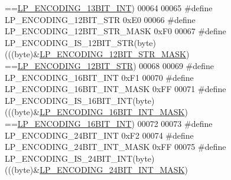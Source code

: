 \begin{DoxyCode}
{      ==}\hyperlink{listpack_8c_a9cfea84c38c5cf0d152f0e40fdd7c1fc}{LP\_ENCODING\_13BIT\_INT}\textcolor{preprocessor}{)}
00064 
00065 \textcolor{preprocessor}{#}\textcolor{preprocessor}{define} \textcolor{preprocessor}{LP\_ENCODING\_12BIT\_STR} 0xE0
00066 \textcolor{preprocessor}{#}\textcolor{preprocessor}{define} \textcolor{preprocessor}{LP\_ENCODING\_12BIT\_STR\_MASK} 0xF0
00067 \textcolor{preprocessor}{#}\textcolor{preprocessor}{define} \textcolor{preprocessor}{LP\_ENCODING\_IS\_12BIT\_STR}\textcolor{preprocessor}{(}\textcolor{preprocessor}{byte}\textcolor{preprocessor}{)} \textcolor{preprocessor}{(}\textcolor{preprocessor}{(}\textcolor{preprocessor}{(}\textcolor{preprocessor}{byte}\textcolor{preprocessor}{)}\textcolor{preprocessor}{&}\hyperlink{listpack_8c_a05220e3facf52ce6d8a3dcd337aec945}{LP\_ENCODING\_12BIT\_STR\_MASK}\textcolor{preprocessor}{)}\textcolor{preprocessor}{
      ==}\hyperlink{listpack_8c_acf85ac38dc36778e68c75963245a3959}{LP\_ENCODING\_12BIT\_STR}\textcolor{preprocessor}{)}
00068 
00069 \textcolor{preprocessor}{#}\textcolor{preprocessor}{define} \textcolor{preprocessor}{LP\_ENCODING\_16BIT\_INT} 0xF1
00070 \textcolor{preprocessor}{#}\textcolor{preprocessor}{define} \textcolor{preprocessor}{LP\_ENCODING\_16BIT\_INT\_MASK} 0xFF
00071 \textcolor{preprocessor}{#}\textcolor{preprocessor}{define} \textcolor{preprocessor}{LP\_ENCODING\_IS\_16BIT\_INT}\textcolor{preprocessor}{(}\textcolor{preprocessor}{byte}\textcolor{preprocessor}{)} \textcolor{preprocessor}{(}\textcolor{preprocessor}{(}\textcolor{preprocessor}{(}\textcolor{preprocessor}{byte}\textcolor{preprocessor}{)}\textcolor{preprocessor}{&}\hyperlink{listpack_8c_acdb130b39e0800198f74fe031bddbfe2}{LP\_ENCODING\_16BIT\_INT\_MASK}\textcolor{preprocessor}{)}\textcolor{preprocessor}{
      ==}\hyperlink{listpack_8c_a4e888717b76a31a4ea334a03fea25047}{LP\_ENCODING\_16BIT\_INT}\textcolor{preprocessor}{)}
00072 
00073 \textcolor{preprocessor}{#}\textcolor{preprocessor}{define} \textcolor{preprocessor}{LP\_ENCODING\_24BIT\_INT} 0xF2
00074 \textcolor{preprocessor}{#}\textcolor{preprocessor}{define} \textcolor{preprocessor}{LP\_ENCODING\_24BIT\_INT\_MASK} 0xFF
00075 \textcolor{preprocessor}{#}\textcolor{preprocessor}{define} \textcolor{preprocessor}{LP\_ENCODING\_IS\_24BIT\_INT}\textcolor{preprocessor}{(}\textcolor{preprocessor}{byte}\textcolor{preprocessor}{)} \textcolor{preprocessor}{(}\textcolor{preprocessor}{(}\textcolor{preprocessor}{(}\textcolor{preprocessor}{byte}\textcolor{preprocessor}{)}\textcolor{preprocessor}{&}\hyperlink{listpack_8c_abaa8acd1d2b43ceae41f6a7ffeeda368}{LP\_ENCODING\_24BIT\_INT\_MASK}\textcolor{preprocessor}{)}\textcolor{preprocessor}{
}
\end{DoxyCode}
